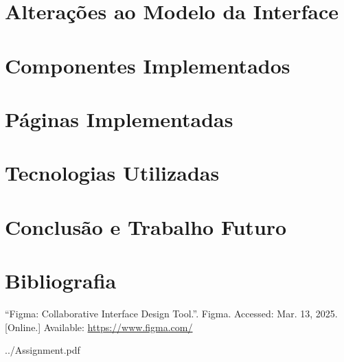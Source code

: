 \documentclass[12pt, a4paper]{article}
\begin{document}
\begin{abstract}
    \noindent
\end{abstract}

\section{Alterações ao Modelo da Interface}

\section{Componentes Implementados}

\section{Páginas Implementadas}

\section{Tecnologias Utilizadas}

\section{Conclusão e Trabalho Futuro}

\begingroup
\section{Bibliografia}
\renewcommand{\section}[2]{}

\begin{thebibliography}{9}
        ``Figma: Collaborative Interface Design Tool.''. Figma. Accessed: Mar. 13, 2025. [Online.]
        Available: \url{https://www.figma.com/}
\end{thebibliography}
\endgroup


    {../Assignment.pdf}

\end{document}
